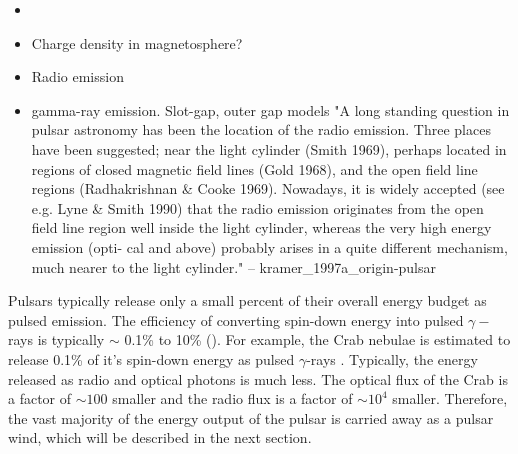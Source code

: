 \begin{itemize}
  \item
\item Charge density in magnetosphere?
  \item Radio emission
  \item gamma-ray emission. Slot-gap, outer gap models
"A long standing question in pulsar astronomy has been the location
of the radio emission. Three places have been suggested; near the light
cylinder (Smith 1969), perhaps located in regions of closed magnetic
field lines (Gold 1968), and the open field line regions (Radhakrishnan
\& Cooke 1969). Nowadays, it is widely accepted (see e.g. Lyne \& Smith
1990) that the radio emission originates from the open field line region
well inside the light cylinder, whereas the very high energy emission
(opti- cal and above) probably arises in a quite different mechanism,
much nearer to the light cylinder." -- kramer\_1997a\_origin-pulsar
\end{itemize}


Pulsars typically release only a small percent of their overall
energy budget as pulsed emission. The efficiency of converting
spin-down energy into pulsed $\gamma-$rays is typically $\sim$
0.1\% to 10\% (\cite{abdo_2010a_first-fermi}).  For example, the
Crab nebulae is estimated to release 0.1\% of it's spin-down energy
as pulsed $\gamma$-rays \cite{abdo_2010a_fermi-large}.  Typically,
the energy released as radio and optical photons is much less.
The optical flux of the Crab is a factor of $\sim100$ smaller
\cite{cocke_1969_discovery-optical} and the radio flux is a factor of
$\sim 10^4$ smaller.  
Therefore, the vast majority of the energy output of
the pulsar is carried away as a pulsar wind, which will 
be described in the next section.


